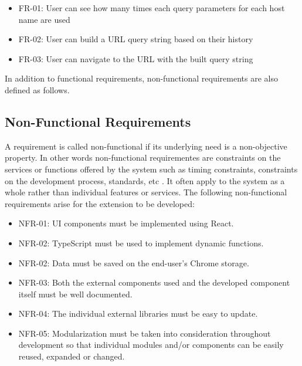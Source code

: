 \begin{itemize}
  \item FR-01: User can see how many times each query parameters for each host name are used
  \item FR-02: User can build a URL query string based on their history
  \item FR-03: User can navigate to the URL with the built query string
\end{itemize}

In addition to functional requirements, non-functional requirements are also defined as follows.

\subsection{Non-Functional Requirements}
A requirement is called non-functional if its underlying need is a non-objective property. In other words non-functional requirementes are constraints on the services or functions offered by the system such as timing constraints, constraints on the development process, standards, etc \autocite{sommerville2011software}. It often apply to the system as a whole rather than individual features or services. The following non-functional requirements arise for the extension to be developed:

\begin{itemize}
  \item NFR-01: UI components must be implemented using React.
  \item NFR-02: TypeScript must be used to implement dynamic functions.
  \item NFR-02: Data must be saved on the end-user's Chrome storage.
  \item NFR-03: Both the external components used and the developed component itself must be well documented.
  \item NFR-04: The individual external libraries must be easy to update.
  \item NFR-05: Modularization must be taken into consideration throughout development so that individual modules and/or components can be easily reused, expanded or changed.
\end{itemize}

